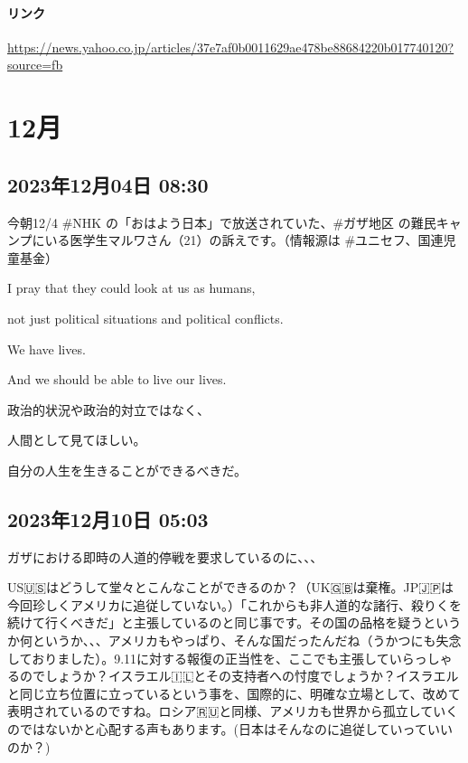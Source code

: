 \documentclass[facebook_diary.tex]{subfiles}
\begin{document}
\paragraph{リンク}
\url{https://news.yahoo.co.jp/articles/37e7af0b0011629ae478be88684220b017740120?source=fb}

\section{12月}

\subsection*{2023年12月04日 08:30}

今朝12/4 \#NHK の「おはよう日本」で放送されていた、\#ガザ地区 の難民キャンプにいる医学生マルワさん（21）の訴えです。（情報源は \#ユニセフ、国連児童基金）


I pray that they could look at us as humans,

not just political situations and political conflicts.

We have lives.

And we should be able to live our lives.


政治的状況や政治的対立ではなく、

人間として見てほしい。

自分の人生を生きることができるべきだ。

\subsection*{2023年12月10日 05:03}

ガザにおける即時の人道的停戦を要求しているのに、、、

US🇺🇸はどうして堂々とこんなことができるのか？（UK🇬🇧は棄権。JP🇯🇵は今回珍しくアメリカに追従していない。）「これからも非人道的な諸行、殺りくを続けて行くべきだ」と主張しているのと同じ事です。その国の品格を疑うというか何というか、、、アメリカもやっぱり、そんな国だったんだね（うかつにも失念しておりました）。9.11に対する報復の正当性を、ここでも主張していらっしゃるのでしょうか？イスラエル🇮🇱とその支持者への忖度でしょうか？イスラエルと同じ立ち位置に立っているという事を、国際的に、明確な立場として、改めて表明されているのですね。ロシア🇷🇺と同様、アメリカも世界から孤立していくのではないかと心配する声もあります。(日本はそんなのに追従していっていいのか？)
\end{document}
